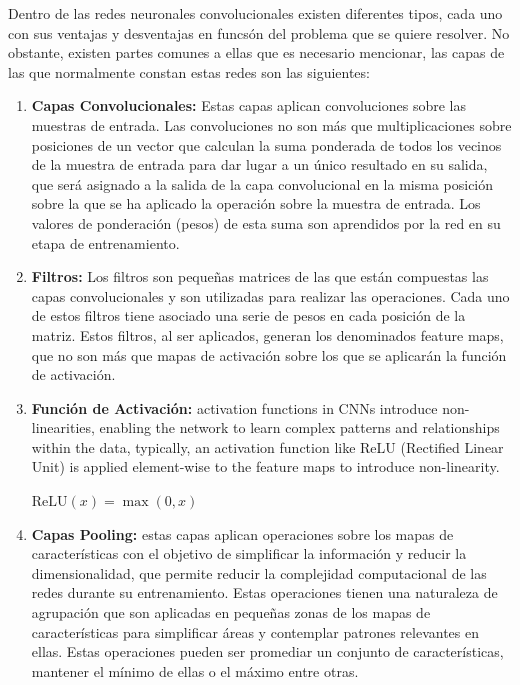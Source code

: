 \documentclass{uathesis-es}
\begin{document}
Dentro de las redes neuronales convolucionales existen diferentes tipos, cada uno con sus ventajas y desventajas en funcsón del problema que se quiere resolver. No obstante, existen partes comunes a ellas que es necesario mencionar, las capas de las que normalmente constan estas redes son las siguientes:

\begin{enumerate}
    \item \textbf{Capas Convolucionales:} Estas capas aplican convoluciones sobre las muestras de entrada. Las convoluciones no son más que multiplicaciones sobre posiciones de un vector que calculan la suma ponderada de todos los vecinos de la muestra de entrada para dar lugar a un único resultado en su salida, que será asignado a la salida de la capa convolucional en la misma posición sobre la que se ha aplicado la operación sobre la muestra de entrada. Los valores de ponderación (pesos) de esta suma son aprendidos por la red en su etapa de entrenamiento.
    
    \item \textbf{Filtros:} Los filtros son pequeñas matrices de las que están compuestas las capas convolucionales y son utilizadas para realizar las operaciones. Cada uno de estos filtros tiene asociado una serie de pesos en cada posición de la matriz. Estos filtros, al ser aplicados, generan los denominados feature maps, que no son más que mapas de activación sobre los que se aplicarán la función de activación.
    
    \item \textbf{Función de Activación:} activation functions in CNNs introduce non-linearities, enabling the network to learn complex patterns and relationships within the data, typically, an activation function like ReLU (Rectified Linear Unit) is applied element-wise to the feature maps to introduce non-linearity. \begin{center}
        $\text{ReLU}(x) = \max(0, x)$
    \end{center}
    
    \item \textbf{Capas Pooling:} estas capas aplican operaciones sobre los mapas de características con el objetivo de simplificar la información y reducir la dimensionalidad, que permite reducir la complejidad computacional de las redes durante su entrenamiento. Estas operaciones tienen una naturaleza de agrupación que son aplicadas en pequeñas zonas de los mapas de características para simplificar áreas y contemplar patrones relevantes en ellas. Estas operaciones pueden ser promediar un conjunto de características, mantener el mínimo de ellas o el máximo entre otras.
    

\end{enumerate}
\end{document}
